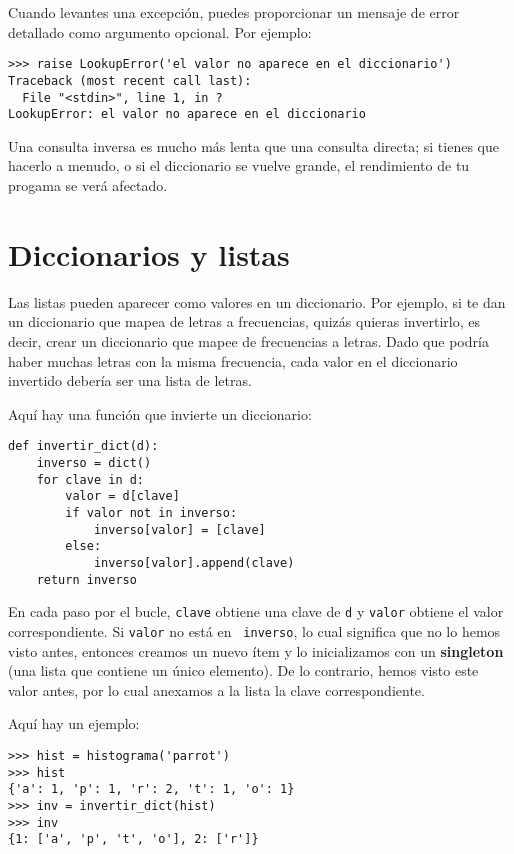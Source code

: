 \documentclass[10pt]{book}
\begin{document}
Cuando levantes una excepción, puedes proporcionar un mensaje de error detallado como argumento opcional.  Por ejemplo:

\begin{verbatim}
>>> raise LookupError('el valor no aparece en el diccionario')
Traceback (most recent call last):
  File "<stdin>", line 1, in ?
LookupError: el valor no aparece en el diccionario
\end{verbatim}
%
Una consulta inversa es mucho más lenta que una consulta directa; si
tienes que hacerlo a menudo, o si el diccionario se vuelve grande, el rendimiento
de tu progama se verá afectado.


\section{Diccionarios y listas}
\label{invert}

Las listas pueden aparecer como valores en un diccionario.  Por ejemplo, si
te dan un diccionario que mapea de letras a frecuencias,
quizás quieras invertirlo, es decir, crear un diccionario que mapee
de frecuencias a letras.  Dado que podría haber muchas letras
con la misma frecuencia, cada valor en el diccionario invertido
debería ser una lista de letras.

Aquí hay una función que invierte un diccionario:

\begin{verbatim}
def invertir_dict(d):
    inverso = dict()
    for clave in d:
        valor = d[clave]
        if valor not in inverso:
            inverso[valor] = [clave]
        else:
            inverso[valor].append(clave)
    return inverso
\end{verbatim}
%
En cada paso por el bucle, {\tt clave} obtiene una clave de {\tt d} y
{\tt valor} obtiene el valor correspondiente.  Si {\tt valor} no está en {\tt
  inverso}, lo cual significa que no lo hemos visto antes, entonces creamos un nuevo
ítem y lo inicializamos con un {\bf singleton} (una lista que contiene un
único elemento).  De lo contrario, hemos visto este valor antes, por lo cual
anexamos a la lista la clave correspondiente.  

Aquí hay un ejemplo:

\begin{verbatim}
>>> hist = histograma('parrot')
>>> hist
{'a': 1, 'p': 1, 'r': 2, 't': 1, 'o': 1}
>>> inv = invertir_dict(hist)
>>> inv
{1: ['a', 'p', 't', 'o'], 2: ['r']}
\end{verbatim}
\end{document}

